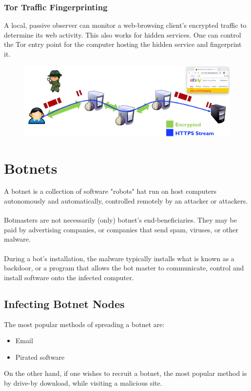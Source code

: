 \documentclass[10pt,a4paper]{report}
\begin{document}
\subsubsection{Tor Traffic Fingerprinting}
A local, passive observer can monitor a web-browsing client’s encrypted traffic to determine its web activity. This also works for hidden services. One can control the Tor entry point for the computer hosting the hidden service and fingerprint it.
\begin{figure}[H]
\centering
\includegraphics[scale=0.3]{26.png}
\end{figure}
\section{Botnets}
A botnet is a collection of software "robots" hat run on host computers autonomously and automatically, controlled remotely by an attacker or attackers.\\
\\
Botmasters are not necessarily (only) botnet’s end-beneficiaries. They may be paid by advertising companies, or companies that send spam, viruses, or other malware.\\
\\
During a bot’s installation, the malware typically installs what is known as a backdoor, or a program that allows the bot master to communicate, control and install software onto the infected computer.
\subsection{Infecting Botnet Nodes}
The most popular methods of spreading a botnet are:
\begin{itemize}
\item Email
\item Pirated software
\end{itemize}
On the other hand, if one wishes to recruit a botnet, the most popular method is by drive-by download, while visiting a malicious site.
\end{document}
